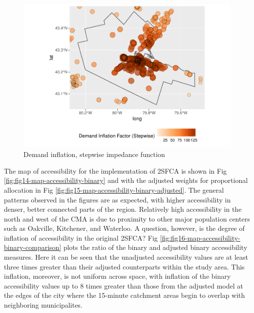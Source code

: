 \documentclass[10pt,letterpaper]{article}
\begin{document}
\begin{figure}
\includegraphics[width=0.95\linewidth]{Supply_and_Demand_Inflation_in_FCA_Methods_v2.1_files/figure-latex/fig13-map-demand-inflation-stepwise-1} \caption{\label{fig:fig13-map-demand-inflation-stepwise}Demand inflation, stepwise impedance function}\label{fig:fig13-map-demand-inflation-stepwise}
\end{figure}

The map of accessibility for the implementation of 2SFCA is shown in Fig
\ref{fig:fig14-map-accessibility-binary} and with the adjusted weights
for proportional allocation in Fig
\ref{fig:fig15-map-accessibility-binary-adjusted}. The general patterns
observed in the figures are as expected, with higher accessibility in
denser, better connected parts of the region. Relatively high
accessibility in the north and west of the CMA is due to proximity to
other major population centers such as Oakville, Kitchener, and
Waterloo. A question, however, is the degree of inflation of
accessibility in the original 2SFCA? Fig
\ref{fig:fig16-map-accessibility-binary-comparison} plots the ratio of
the binary and adjusted binary accessibility measures. Here it can be
seen that the unadjusted accessibility values are at least three times
greater than their adjusted counterparts within the study area. This
inflation, moreover, is not uniform across space, with inflation of the
binary accessibility values up to 8 times greater than those from the
adjusted model at the edges of the city where the 15-minute catchment
areas begin to overlap with neighboring municipalites.
\end{document}
